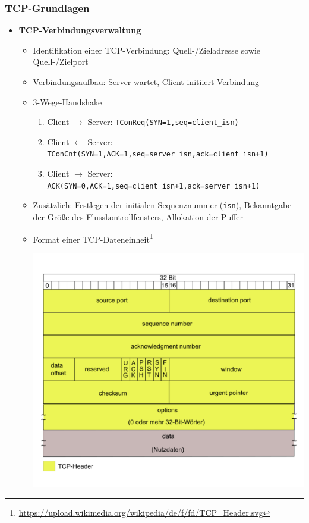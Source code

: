 \subsubsection{TCP-Grundlagen}
\begin{itemize}
	\item \textbf{TCP-Verbindungsverwaltung}
	\begin{itemize}
		\item Identifikation einer TCP-Verbindung: Quell-/Zieladresse sowie Quell-/Zielport
		\item Verbindungsaufbau: Server wartet, Client initiiert Verbindung
		\item 3-Wege-Handshake
		\begin{enumerate}
			\item Client \(\rightarrow\) Server: \texttt{TConReq(SYN=1,seq=client\_isn)}
			\item Client \(\leftarrow\) Server: \texttt{TConCnf(SYN=1,ACK=1,seq=server\_isn,ack=client\_isn+1)}
			\item Client \(\rightarrow\) Server: \texttt{ACK(SYN=0,ACK=1,seq=client\_isn+1,ack=server\_isn+1)}
		\end{enumerate}
		\item Zusätzlich: Festlegen der initialen Sequenznummer (\texttt{isn}), Bekanntgabe der Größe des Flusskontrollfensters, Allokation der Puffer
		\item Format einer TCP-Dateneinheit\footnote{\url{https://upload.wikimedia.org/wikipedia/de/f/fd/TCP_Header.svg}}\\
			\begin{minipage}{\linewidth}
				\includegraphics[scale=0.38]{telematik/TCP_Header.pdf}

\end{minipage}
\end{itemize}
\end{itemize}
